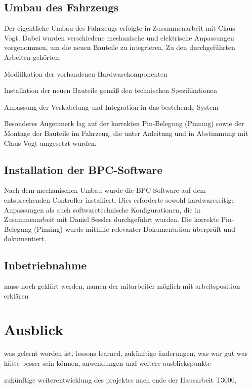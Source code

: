 \documentclass[a4paper, 12pt]{article} %
\begin{document}
\begin{spacing}{1.5}
 \subsection{Umbau des Fahrzeugs}
 Der eigentliche Umbau des Fahrzeugs erfolgte in Zusammenarbeit mit Claus Vogt. Dabei wurden verschiedene
 mechanische und elektrische Anpassungen vorgenommen, um die neuen Bauteile zu integrieren. 
 Zu den durchgeführten Arbeiten gehörten:
 
 Modifikation der vorhandenen Hardwarekomponenten

 Installation der neuen Bauteile gemäß den technischen Spezifikationen

 Anpassung der Verkabelung und Integration in das bestehende System

 Besonderes Augenmerk lag auf der korrekten Pin-Belegung (Pinning) sowie der Montage der Bauteile im Fahrzeug, die unter Anleitung und in Abstimmung mit Claus Vogt umgesetzt wurden.

 \subsection{Installation der BPC-Software}
Nach dem mechanischen Umbau wurde die \acs{BPC}-Software auf 
dem entsprechenden Controller installiert. Dies erforderte sowohl hardwareseitige Anpassungen
 als auch softwaretechnische Konfigurationen, die in Zusammenarbeit mit Daniel Sessler durchgeführt wurden. 
 Die korrekte Pin-Belegung (Pinning) wurde mithilfe relevanter Dokumentation überprüft und dokumentiert.

\subsection{Inbetriebnahme}
muss noch geklärt werden, namen der mitarbeiter möglich mit arbeitsposition erklären

\end{spacing}
\section{Ausblick}
\begin{spacing}{1.5}  %
    \fontsize{14pt}{14pt}\selectfont  %
was gelernt worden ist, lessons learned, zukünftige änderungen, was war gut was hätte besser sein können,  anwendungen und weitere ausblickspunkte

zukünftige weiterentwicklung des projektes nach ende der Hausarbeit T3000, 
\end{spacing}

\clearpage

\begingroup
\renewcommand{\bibfont}{\fontsize{13pt}{12pt}\selectfont}  
\sloppy
\nocite{*}
\printbibliography
\end{document}
